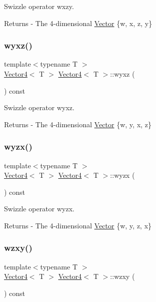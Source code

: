 Swizzle operator wxzy. \begin{DoxyReturn}{Returns}
-\/ The 4-\/dimensional \mbox{\hyperlink{class_vector}{Vector}} \{w, x, z, y\} 
\end{DoxyReturn}
\mbox{\label{class_vector4_a4dd8131d29f2bd26cb67d37f1b61aa01}} 
\subsubsection{\texorpdfstring{wyxz()}{wyxz()}}
{\footnotesize\ttfamily template$<$typename T $>$ \\
\mbox{\hyperlink{class_vector4}{Vector4}}$<$ T $>$ \mbox{\hyperlink{class_vector4}{Vector4}}$<$ T $>$\+::wyxz (\begin{DoxyParamCaption}{ }\end{DoxyParamCaption}) const}

Swizzle operator wyxz. \begin{DoxyReturn}{Returns}
-\/ The 4-\/dimensional \mbox{\hyperlink{class_vector}{Vector}} \{w, y, x, z\} 
\end{DoxyReturn}
\mbox{\label{class_vector4_af51ae6f93e2c05deb16ddd69be0b56bd}} 
\subsubsection{\texorpdfstring{wyzx()}{wyzx()}}
{\footnotesize\ttfamily template$<$typename T $>$ \\
\mbox{\hyperlink{class_vector4}{Vector4}}$<$ T $>$ \mbox{\hyperlink{class_vector4}{Vector4}}$<$ T $>$\+::wyzx (\begin{DoxyParamCaption}{ }\end{DoxyParamCaption}) const}

Swizzle operator wyzx. \begin{DoxyReturn}{Returns}
-\/ The 4-\/dimensional \mbox{\hyperlink{class_vector}{Vector}} \{w, y, z, x\} 
\end{DoxyReturn}
\mbox{\label{class_vector4_aa519a7a86891dcee0b7129c1d47df891}} 
\subsubsection{\texorpdfstring{wzxy()}{wzxy()}}
{\footnotesize\ttfamily template$<$typename T $>$ \\
\mbox{\hyperlink{class_vector4}{Vector4}}$<$ T $>$ \mbox{\hyperlink{class_vector4}{Vector4}}$<$ T $>$\+::wzxy (\begin{DoxyParamCaption}{ }\end{DoxyParamCaption}) const}

